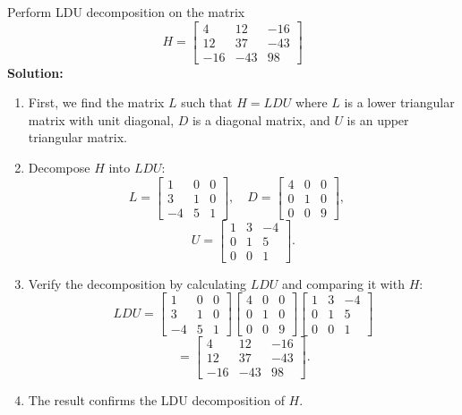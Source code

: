 \documentclass[8pt, a4paper, landscape]{extarticle}
\begin{document}
\begin{multicols*}{4}
  Perform LDU decomposition on the matrix
  \[
    H = \begin{bmatrix} 4 & 12 & -16 \\ 12 & 37 & -43 \\ -16 & -43 & 98 \end{bmatrix}
  \]
  \textbf{Solution:}
  \begin{enumerate}
    \item First, we find the matrix $L$ such that $H = LDU$ where $L$ is a lower triangular matrix with unit diagonal, $D$ is a diagonal matrix, and $U$ is an upper triangular matrix.
    \item Decompose $H$ into $LDU$:
          \[
            L = \begin{bmatrix}
              1  & 0 & 0 \\
              3  & 1 & 0 \\
              -4 & 5 & 1
            \end{bmatrix}, \quad
            D = \begin{bmatrix}
              4 & 0 & 0 \\
              0 & 1 & 0 \\
              0 & 0 & 9
            \end{bmatrix}, \quad
          \]
          \[
            U = \begin{bmatrix}
              1 & 3 & -4 \\
              0 & 1 & 5  \\
              0 & 0 & 1
            \end{bmatrix}.
          \]
    \item Verify the decomposition by calculating $LDU$ and comparing it with $H$:
          \[
            LDU = \begin{bmatrix}
              1  & 0 & 0 \\
              3  & 1 & 0 \\
              -4 & 5 & 1
            \end{bmatrix}
            \begin{bmatrix}
              4 & 0 & 0 \\
              0 & 1 & 0 \\
              0 & 0 & 9
            \end{bmatrix}
            \begin{bmatrix}
              1 & 3 & -4 \\
              0 & 1 & 5  \\
              0 & 0 & 1
            \end{bmatrix}
          \]
          \[
            = \begin{bmatrix}
              4   & 12  & -16 \\
              12  & 37  & -43 \\
              -16 & -43 & 98
            \end{bmatrix}.
          \]
    \item The result confirms the LDU decomposition of $H$.
  \end{enumerate}


\end{multicols*}
\end{document}

